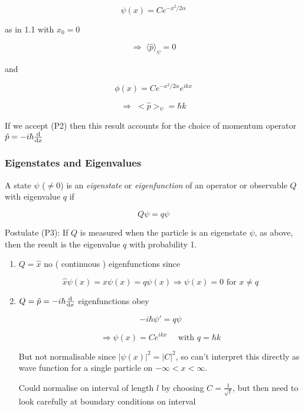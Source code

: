 \documentclass[a4paper]{article}
\begin{document}
\begin{eg}
\[ \psi(x) = C e^{- x^{2} / 2 \alpha} \]

as in 1.1 with $ x_{0} = 0 $

\[ \Rightarrow \;   \langle \hat{p} \rangle _{\psi} = 0 \]

and 

\[ \phi(x) = C e^{-x^{2} / 2 \alpha} e^{i k x} \]





\[ \Rightarrow \; <\hat{p}>_{\psi} = \hbar k  \]

If we accept (P2) then this result accounts for the choice of momentum operator  $ \hat{p} = - i \hbar \frac{\mathrm{d} }{\mathrm{d} x} $

\subsubsection{Eigenstates and Eigenvalues}

A state $ \psi $ ($ \neq 0 $) is an \emph{eigenstate} or \emph{eigenfunction} of an operator or observable $ Q $ with eigenvalue $ q $ if 

\[ Q \psi = q \psi \]

Postulate (P3): If $ Q $ is measured when the particle is an eigenstate $ \psi $, as above, then the result is the eigenvalue $ q $ with probability 1. 

\begin{eg}
	\begin{enumerate}
		\item $ Q = \hat{x} $ no ( continuous ) eigenfunctions since
		
		\[ \hat{x} \psi(x)  = x \psi(x) = q \psi(x) \Rightarrow \psi(x) = 0 \text{ for } x \neq q \]
		
		\item $ Q = \hat{p} = - i \hbar \frac{\mathrm{d} }{\mathrm{d} x } $ eigenfunctions obey
		
		\[ - i \hbar \psi' = q \psi \]
		
		\[ \Rightarrow \psi(x) = C e^{i k x} \quad \text{ with } q = \hbar k \]
		
		But not normalisable since $ | \psi(x) |^{2} = | C |^{2} $, so can't interpret this directly as wave function for a single particle on $ - \infty < x < \infty $.
		
		Could normalise on interval of length $ l $ by choosing $ C = \frac{1}{\sqrt{l}} $, but then need to look carefully at boundary conditions on interval
		

\end{enumerate}
\end{eg}
\end{eg}
\end{document}

